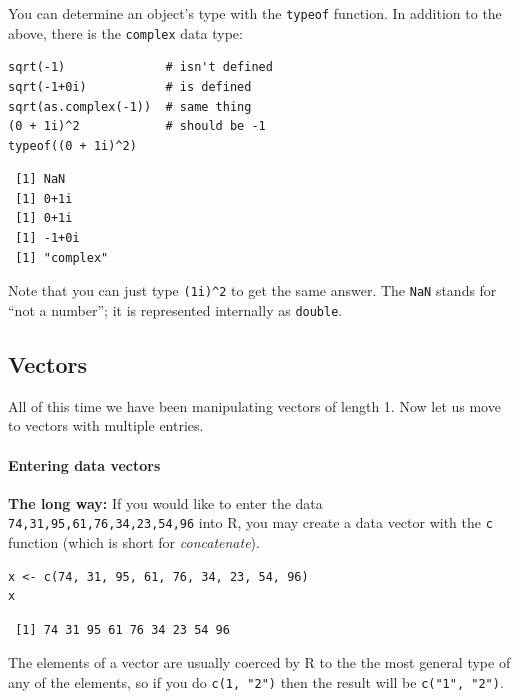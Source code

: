 \documentclass[captions=tableheading]{scrbook}
\begin{document}
You can determine an object's type with the \texttt{typeof} function. In addition to the above, there is the \texttt{complex} data type:


\begin{verbatim}
sqrt(-1)              # isn't defined
sqrt(-1+0i)           # is defined
sqrt(as.complex(-1))  # same thing
(0 + 1i)^2            # should be -1
typeof((0 + 1i)^2)
\end{verbatim}

\begin{verbatim}
 [1] NaN
 [1] 0+1i
 [1] 0+1i
 [1] -1+0i
 [1] "complex"
\end{verbatim}

Note that you can just type \texttt{(1i)\textasciicircum{}2} to get the same answer. The \texttt{NaN} stands for ``not a number''; it is represented internally as \texttt{double}. 
\subsection{Vectors}
\label{sec-2-3-3}

\label{sub:Vectors}

All of this time we have been manipulating vectors of length 1. Now let us move to vectors with multiple entries.

\paragraph*{Entering data vectors}

\textbf{The long way:} If you would like to enter the data \texttt{74,31,95,61,76,34,23,54,96} into \textsf{R}, you may create a data vector with the \texttt{c} function (which is short for \emph{concatenate}).


\begin{verbatim}
x <- c(74, 31, 95, 61, 76, 34, 23, 54, 96)
x
\end{verbatim}

\begin{verbatim}
 [1] 74 31 95 61 76 34 23 54 96
\end{verbatim}

The elements of a vector are usually coerced by \textsf{R} to the the most general type of any of the elements, so if you do \texttt{c(1, "2")} then the result will be \texttt{c("1", "2")}.
\end{document}
